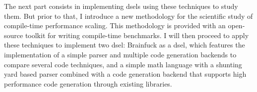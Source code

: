 \documentclass[main]{subfiles}
\begin{document}
The next part consists in implementing \glspl{dsel} using these techniques
to study them. But prior to that, I introduce a new methodology
for the scientific study of compile-time performance scaling.
This methodology is provided with an open-source toolkit for writing
\cpp compile-time benchmarks. I will then proceed to apply these
techniques to implement two \gls{dsel}:
Brainfuck as a \gls{dsel}, which features the implementation of a simple parser
and multiple code generation backends to compare several code techniques,
and a simple math language with a shunting yard based parser combined with
a code generation backend that supports high performance code generation
through existing \cpp libraries.


\end{document}
